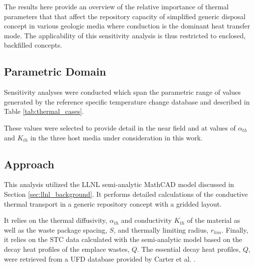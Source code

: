 
The results here provide an overview of the relative importance of thermal
parameters that that affect the repository capacity of simplified generic
disposal concept in various geologic media where conduction is the dominant
heat transfer mode. The applicability of this sensitivity analysis is thus
restricted to enclosed, backfilled concepts.  

\subsection{Parametric Domain}

Sensitivity analyses were conducted which span the parametric range of values 
generated by the reference specific temperature change database and described 
in Table \ref{tab:thermal_cases}.  



These values were selected to provide detail in the near field and at values of
$\alpha_{th}$ and $K_{th}$ in the three host media under consideration in this
work.

\subsection{Approach}

This analysis utilized the \gls{LLNL} semi-analytic MathCAD model
discussed in Section \ref{sec:llnl_background}.  It performs detailed
calculations of the conductive thermal transport in a generic repository
concept with a gridded layout.  

It relies on the thermal diffusivity, $\alpha_{th}$ and conductivity $K_{th}$ of 
the material as well as the waste package spacing, $S$, and thermally limiting 
radius, $r_{lim}$. Finally, it relies on the \gls{STC} data calculated with the 
semi-analytic model based on the decay heat profiles of the emplace wastes, $Q$. 
The essential decay heat profiles, $Q$, were retrieved from a \gls{UFD} database 
provided by Carter et al. \cite{carter_fuel_2011}.


